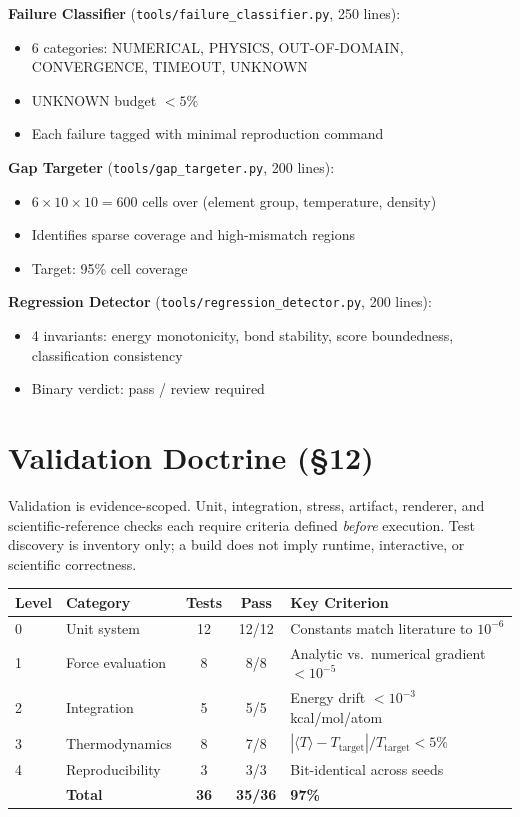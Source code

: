 \documentclass[11pt, a4paper]{article}
\begin{document}
\textbf{Failure Classifier} (\texttt{tools/failure\_classifier.py}, 250 lines):
\begin{itemize}
\item 6 categories: NUMERICAL, PHYSICS, OUT-OF-DOMAIN, CONVERGENCE, TIMEOUT, UNKNOWN
\item UNKNOWN budget $< 5\%$
\item Each failure tagged with minimal reproduction command
\end{itemize}

\textbf{Gap Targeter} (\texttt{tools/gap\_targeter.py}, 200 lines):
\begin{itemize}
\item $6 \times 10 \times 10 = 600$ cells over (element group, temperature, density)
\item Identifies sparse coverage and high-mismatch regions
\item Target: 95\% cell coverage
\end{itemize}

\textbf{Regression Detector} (\texttt{tools/regression\_detector.py}, 200 lines):
\begin{itemize}
\item 4 invariants: energy monotonicity, bond stability, score boundedness, classification consistency
\item Binary verdict: pass / review required
\end{itemize}


\section{Validation Doctrine (\S12)}

Validation is evidence-scoped. Unit, integration, stress, artifact, renderer, and scientific-reference checks each require criteria defined \emph{before} execution. Test discovery is inventory only; a build does not imply runtime, interactive, or scientific correctness.

\begin{center}
\begin{tabular}{llccl}
\toprule
Level & Category & Tests & Pass & Key Criterion \\
\midrule
0 & Unit system & 12 & 12/12 & Constants match literature to $10^{-6}$ \\
1 & Force evaluation & 8 & 8/8 & Analytic vs.\ numerical gradient $< 10^{-5}$ \\
2 & Integration & 5 & 5/5 & Energy drift $< 10^{-3}$ kcal/mol/atom \\
3 & Thermodynamics & 8 & 7/8 & $|\langle T \rangle - T_\text{target}|/T_\text{target} < 5\%$ \\
4 & Reproducibility & 3 & 3/3 & Bit-identical across seeds \\
\midrule
& \textbf{Total} & \textbf{36} & \textbf{35/36} & \textbf{97\%} \\
\bottomrule
\end{tabular}
\end{center}
\end{document}
